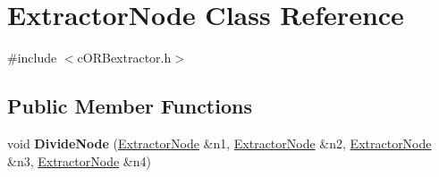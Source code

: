 \hypertarget{classExtractorNode}{}\section{Extractor\+Node Class Reference}
\label{classExtractorNode}


{\ttfamily \#include $<$c\+O\+R\+Bextractor.\+h$>$}

\subsection*{Public Member Functions}
\begin{DoxyCompactItemize}
\item 
void {\bfseries Divide\+Node} (\hyperlink{classExtractorNode}{Extractor\+Node} \&n1, \hyperlink{classExtractorNode}{Extractor\+Node} \&n2, \hyperlink{classExtractorNode}{Extractor\+Node} \&n3, \hyperlink{classExtractorNode}{Extractor\+Node} \&n4)\hypertarget{classExtractorNode_acc0f41f35ca9077598fbdfa189fa1b98}{}\label{classExtractorNode_acc0f41f35ca9077598fbdfa189fa1b98}

\end{DoxyCompactItemize}
